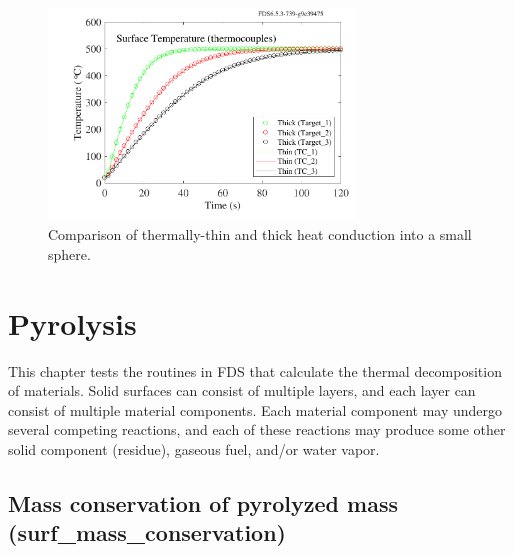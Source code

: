 \documentclass[11pt]{book}
\begin{document}
\begin{figure}[ht]
\noindent
\begin{center}
\includegraphics[width=3.2in]{SCRIPT_FIGURES/thermocouples}
\end{center}
\caption[The {\bf thermocouples} test case.]{Comparison of thermally-thin and thick heat conduction into a small sphere.}
\label{thermocouples}
\end{figure}




\chapter{Pyrolysis}

This chapter tests the routines in FDS that calculate the thermal decomposition of materials. Solid
surfaces can consist of multiple layers, and each layer can consist of multiple material components.
Each material component may undergo several competing reactions, and
each of these reactions may produce some other solid component
(residue), gaseous fuel, and/or water vapor.


\section{Mass conservation of pyrolyzed mass (\texorpdfstring{{\bf surf\_mass\_conservation}}{surf\_mass\_concervation})}
\end{document}
